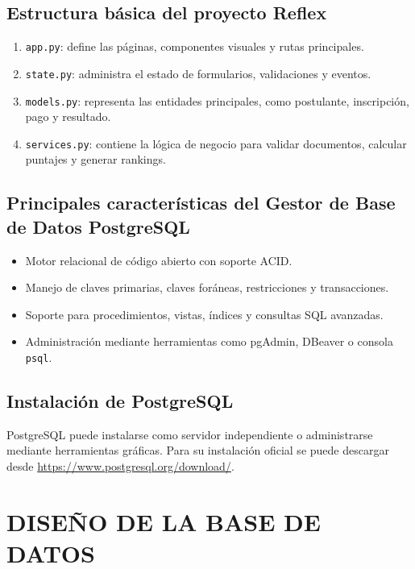 \documentclass[12pt, a4paper]{report}
\begin{document}
\subsection{Estructura básica del proyecto Reflex}

\begin{enumerate}[noitemsep]
  \item \texttt{app.py}: define las páginas, componentes visuales y rutas principales.
  \item \texttt{state.py}: administra el estado de formularios, validaciones y eventos.
  \item \texttt{models.py}: representa las entidades principales, como postulante, inscripción, pago y resultado.
  \item \texttt{services.py}: contiene la lógica de negocio para validar documentos, calcular puntajes y generar rankings.
\end{enumerate}

\subsection{Principales características del Gestor de Base de Datos PostgreSQL}

\begin{itemize}[noitemsep]
  \item Motor relacional de código abierto con soporte ACID.
  \item Manejo de claves primarias, claves foráneas, restricciones y transacciones.
  \item Soporte para procedimientos, vistas, índices y consultas SQL avanzadas.
  \item Administración mediante herramientas como pgAdmin, DBeaver o consola \texttt{psql}.
\end{itemize}

\subsection{Instalación de PostgreSQL}

PostgreSQL puede instalarse como servidor independiente o administrarse mediante herramientas gráficas. Para su instalación oficial se puede descargar desde \url{https://www.postgresql.org/download/}.

\section{DISEÑO DE LA BASE DE DATOS}
\end{document}
